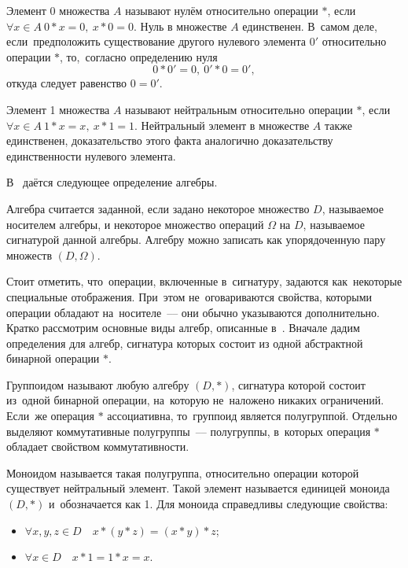 Элемент $0$ множества $A$ называют нулём относительно операции $*$, если $\forall x\in A\ 0*x=0,\ x*0=0$. Нуль в множестве $A$ единственен. В~самом деле, если~предположить существование другого нулевого элемента ${0}'$ относительно операции $*$, то,~согласно определению нуля
\begin{equation*}
	0*{0}'=0,\ {0}'*0={0}',
\end{equation*}
откуда следует равенство $0={0}'$.

Элемент 1 множества $A$ называют нейтральным относительно операции $*$, если $\forall x\in A\ 1*x=x,\ x*1=1$.
Нейтральный элемент в множестве $A$ также единственен, доказательство этого факта аналогично доказательству единственности нулевого элемента.

В~\cite{Bauman_DM, Adelson_Velskiy} даётся следующее определение алгебры.
\begin{mydef}
Алгебра считается заданной, если задано некоторое множество $D$, называемое носителем алгебры, и некоторое множество операций $\Omega $ на $D$, называемое сигнатурой данной алгебры. Алгебру можно записать как упорядоченную пару множеств $\left( D,\Omega  \right)$.
\end{mydef}

Стоит отметить, что~операции, включенные в~сигнатуру, задаются как~некоторые специальные отображения. При~этом не~оговариваются свойства, которыми операции обладают на~носителе~--– они обычно указываются дополнительно.
Кратко рассмотрим основные виды алгебр, описанные в~\cite{Bauman_DM, Adelson_Velskiy, Voevodin}. Вначале дадим определения для алгебр, сигнатура которых состоит из одной абстрактной бинарной операции $*$.

Группоидом называют любую алгебру $\left( D,* \right)$, сигнатура которой состоит из~одной бинарной операции, на~которую не~наложено никаких ограничений. Если~же операция $*$ ассоциативна, то~группоид является полугруппой. Отдельно выделяют коммутативные полугруппы~--– полугруппы, в~которых операция $*$ обладает свойством коммутативности.

Моноидом называется такая полугруппа, относительно операции которой существует нейтральный элемент. Такой элемент называется единицей моноида $\left( D,* \right)$ и~обозначается как 1. Для моноида справедливы следующие свойства:
\begin{itemize}
	\item $\forall x,y,z\in D\quad x*\left( y*z \right)=\left( x*y \right)*z$;
	\item $\forall x\in D\quad x*1=1*x=x$.
\end{itemize}

